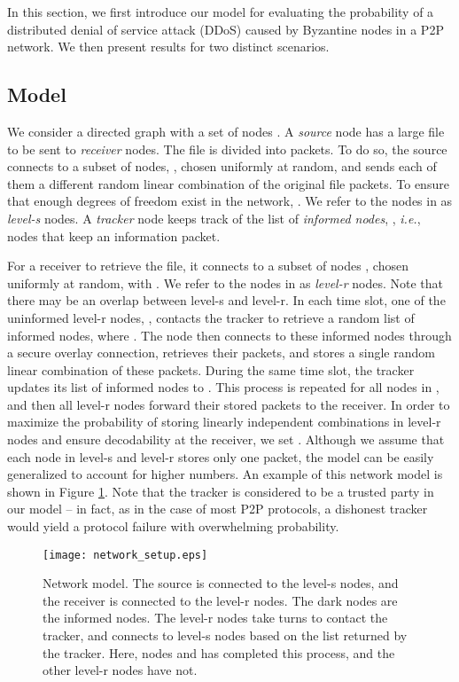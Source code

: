 
In this section, we first introduce our model for evaluating the probability of a distributed denial of service attack (DDoS) caused by Byzantine nodes in a P2P network. We then present results for two distinct scenarios.

\subsection{Model}\label{sect:model}

We consider a directed graph with a set of nodes . A {\em source} node has a large file to be sent to \emph{receiver} nodes. The file is divided into  packets. To do so, the source connects to a subset of nodes, , chosen uniformly at random, and sends each of them a different random linear combination of the original file packets. To ensure that enough degrees of freedom exist in the network, . We refer to the nodes in  as {\em level-s} nodes. A {\em tracker} node keeps track of the list of \emph{informed nodes}, , \emph{i.e.}, nodes that keep an information packet.

For a receiver to retrieve the file, it connects to a subset of nodes , chosen uniformly at random, with . We refer to the nodes in  as \emph{level-r} nodes. Note that there may be an overlap between level-s and level-r. In each time slot, one of the uninformed level-r nodes, , contacts the tracker to retrieve a random list of  informed nodes, where . The node   then connects to these informed nodes through a secure overlay connection, retrieves their  packets, and stores a single random linear combination of these packets. During the same time slot, the tracker updates its list of informed nodes to . This process is repeated for all nodes in , and then all level-r nodes forward their stored packets to the receiver. In order to maximize the probability of storing linearly independent combinations in level-r nodes and ensure decodability at the receiver, we set . Although we assume that each node in level-s and level-r stores only one packet, the model can be easily generalized to account for higher numbers. An example of this network model is shown in Figure \ref{network_setup}.  Note that the tracker is considered to be a trusted party in our model -- in fact, as in the case of most P2P protocols, a dishonest tracker would yield a protocol failure with overwhelming probability.

\begin{figure}[tbp]
\begin{center}
\texttt{[image: network\_setup.eps]}
\caption{Network model. The source is connected to the level-s nodes, and the receiver is connected to the level-r nodes. The dark nodes are the informed nodes. The level-r nodes take turns to contact the tracker, and connects to  level-s nodes based on the list returned by the tracker. Here, nodes  and  has completed this process, and the other level-r nodes have not.}
\label{network_setup}
\end{center}
\vspace*{-0.5cm}
\end{figure}

